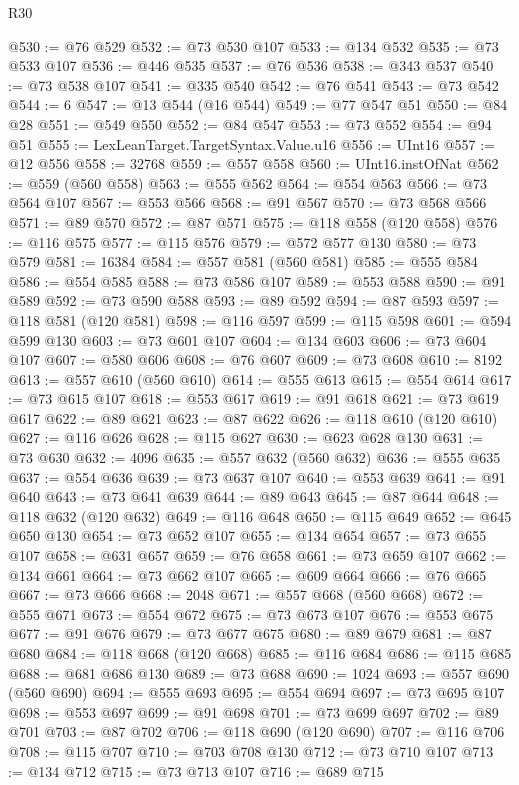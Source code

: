 \begin{lexlean}{R30}
\begin{coremodule}
{{{{{@530 := @76 @529
@532 := @73 @530 @107
@533 := @134 @532
@535 := @73 @533 @107
@536 := @446 @535
@537 := @76 @536
@538 := @343 @537
@540 := @73 @538 @107
@541 := @335 @540
@542 := @76 @541
@543 := @73 @542
@544 := 6
@547 := @13 @544 (@16 @544)
@549 := @77 @547 @51
@550 := @84 @28
@551 := @549 @550
@552 := @84 @547
@553 := @73 @552
@554 := @94 @51
@555 := LexLeanTarget.TargetSyntax.Value.u16
@556 := UInt16
@557 := @12 @556
@558 := 32768
@559 := @557 @558
@560 := UInt16.instOfNat
@562 := @559 (@560 @558)
@563 := @555 @562
@564 := @554 @563
@566 := @73 @564 @107
@567 := @553 @566
@568 := @91 @567
@570 := @73 @568 @566
@571 := @89 @570
@572 := @87 @571
@575 := @118 @558 (@120 @558)
@576 := @116 @575
@577 := @115 @576
@579 := @572 @577 @130
@580 := @73 @579
@581 := 16384
@584 := @557 @581 (@560 @581)
@585 := @555 @584
@586 := @554 @585
@588 := @73 @586 @107
@589 := @553 @588
@590 := @91 @589
@592 := @73 @590 @588
@593 := @89 @592
@594 := @87 @593
@597 := @118 @581 (@120 @581)
@598 := @116 @597
@599 := @115 @598
@601 := @594 @599 @130
@603 := @73 @601 @107
@604 := @134 @603
@606 := @73 @604 @107
@607 := @580 @606
@608 := @76 @607
@609 := @73 @608
@610 := 8192
@613 := @557 @610 (@560 @610)
@614 := @555 @613
@615 := @554 @614
@617 := @73 @615 @107
@618 := @553 @617
@619 := @91 @618
@621 := @73 @619 @617
@622 := @89 @621
@623 := @87 @622
@626 := @118 @610 (@120 @610)
@627 := @116 @626
@628 := @115 @627
@630 := @623 @628 @130
@631 := @73 @630
@632 := 4096
@635 := @557 @632 (@560 @632)
@636 := @555 @635
@637 := @554 @636
@639 := @73 @637 @107
@640 := @553 @639
@641 := @91 @640
@643 := @73 @641 @639
@644 := @89 @643
@645 := @87 @644
@648 := @118 @632 (@120 @632)
@649 := @116 @648
@650 := @115 @649
@652 := @645 @650 @130
@654 := @73 @652 @107
@655 := @134 @654
@657 := @73 @655 @107
@658 := @631 @657
@659 := @76 @658
@661 := @73 @659 @107
@662 := @134 @661
@664 := @73 @662 @107
@665 := @609 @664
@666 := @76 @665
@667 := @73 @666
@668 := 2048
@671 := @557 @668 (@560 @668)
@672 := @555 @671
@673 := @554 @672
@675 := @73 @673 @107
@676 := @553 @675
@677 := @91 @676
@679 := @73 @677 @675
@680 := @89 @679
@681 := @87 @680
@684 := @118 @668 (@120 @668)
@685 := @116 @684
@686 := @115 @685
@688 := @681 @686 @130
@689 := @73 @688
@690 := 1024
@693 := @557 @690 (@560 @690)
@694 := @555 @693
@695 := @554 @694
@697 := @73 @695 @107
@698 := @553 @697
@699 := @91 @698
@701 := @73 @699 @697
@702 := @89 @701
@703 := @87 @702
@706 := @118 @690 (@120 @690)
@707 := @116 @706
@708 := @115 @707
@710 := @703 @708 @130
@712 := @73 @710 @107
@713 := @134 @712
@715 := @73 @713 @107
@716 := @689 @715
}}}}}
\end{coremodule}
\end{lexlean}
